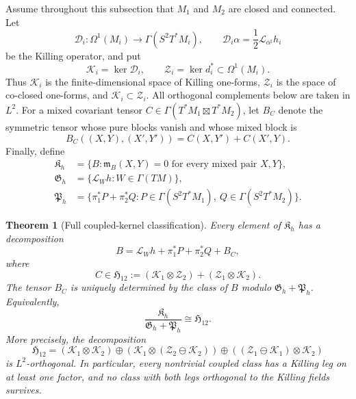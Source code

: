 \documentclass[11pt]{amsart}
\newtheorem{theorem}{Theorem}[section]
\theoremstyle{definition}
\theoremstyle{remark}
\begin{document}
Assume throughout this subsection that $M_1$ and $M_2$ are closed and
connected.  Let
\[
 \mathcal D_i:\Omega^1(M_i)\longrightarrow
 \Gamma(S^2T^*M_i),
 \qquad
 \mathcal D_i\alpha=\frac12\mathcal L_{\alpha^\sharp}h_i
\]
be the Killing operator, and put
\[
 \mathcal K_i=\ker\mathcal D_i,
 \qquad
 \mathcal Z_i=\ker d_i^*\subset\Omega^1(M_i).
\]
Thus $\mathcal K_i$ is the finite-dimensional space of Killing
one-forms, $\mathcal Z_i$ is the space of co-closed one-forms, and
$\mathcal K_i\subset\mathcal Z_i$.  All orthogonal complements below
are taken in $L^2$.  For a mixed covariant tensor
$C\in\Gamma(T^*M_1\boxtimes T^*M_2)$, let $B_C$ denote the symmetric
tensor whose pure blocks vanish and whose mixed block is
\begin{equation}\label{eq:general-mixed-tensor}
 B_C((X,Y),(X',Y'))=C(X,Y')+C(X',Y).
\end{equation}
Finally, define
\begin{align*}
 \mathfrak K_h&=\{B:\mathfrak m_B(X,Y)=0
                     \text{ for every mixed pair }X,Y\},\\
 \mathfrak G_h&=\{\mathcal L_Wh:W\in\Gamma(TM)\},\\
 \mathfrak P_h&=\{\pi_1^*P+\pi_2^*Q:
       P\in\Gamma(S^2T^*M_1),\ Q\in\Gamma(S^2T^*M_2)\}.
\end{align*}

\begin{theorem}[Full coupled-kernel classification]
\label{thm:full-coupled-kernel}
Every element of $\mathfrak K_h$ has a decomposition
\begin{equation}\label{eq:full-kernel-decomposition}
 B=\mathcal L_Wh+\pi_1^*P+\pi_2^*Q+B_C,
\end{equation}
where
\begin{equation}\label{eq:canonical-coupled-space}
 C\in\mathfrak H_{12}:=
 (\mathcal K_1\otimes\mathcal Z_2)
 +(\mathcal Z_1\otimes\mathcal K_2).
\end{equation}
The tensor $B_C$ is uniquely determined by the class of $B$ modulo
$\mathfrak G_h+\mathfrak P_h$.  Equivalently,
\begin{equation}\label{eq:full-kernel-quotient}
 \frac{\mathfrak K_h}{\mathfrak G_h+\mathfrak P_h}
 \cong\mathfrak H_{12}.
\end{equation}
More precisely, the decomposition
\begin{equation}\label{eq:coupled-orthogonal-splitting}
 \mathfrak H_{12}
 = (\mathcal K_1\otimes\mathcal K_2)
 \oplus
   (\mathcal K_1\otimes(\mathcal Z_2\ominus\mathcal K_2))
 \oplus
   ((\mathcal Z_1\ominus\mathcal K_1)\otimes\mathcal K_2)
\end{equation}
is $L^2$-orthogonal.  In particular, every nontrivial coupled class
has a Killing leg on at least one factor, and no class with both legs
orthogonal to the Killing fields survives.
\end{theorem}
\end{document}
